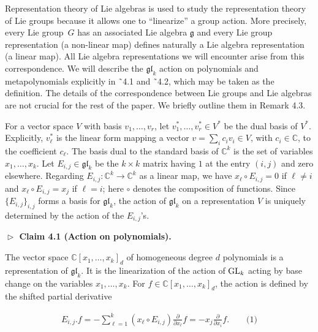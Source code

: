 \documentclass[10pt,a4paper]{article}
\begin{document}
Representation theory of Lie algebras is used to study the representation theory of Lie groups because it allows one to “linearize” a group action.
More precisely, every Lie group $G$ has an associated Lie algebra $\mathfrak{g}$ and every Lie group representation (a non-linear map) defines naturally a Lie algebra representation (a linear map).
All Lie algebra representations we will encounter arise from this correspondence. We will describe the $\mathfrak{gl}_{k}$ action on polynomials and metapolynomials explicitly in ˜4.1 and ˜4.2, which may be taken as the definition. The details of the correspondence between Lie groups and Lie algebras are not crucial for the rest of the paper. We briefly outline them in Remark 4.3.





For a vector space $V$ with basis $v_{1},\ldots,v_{r}$, let $v_{1}^{*},\ldots,v_{r}^{*}\in V^{*}$ be the dual basis of $V^{*}$.
Explicitly, $v_{\ell}^{*}$ is the linear form mapping a vector $v=\sum_{i}c_{i}v_{i}\in V$, with $c_{i}\in\mathbb{C}$, to the coefficient $c_{\ell}$.
The basis dual to the standard basis of $\mathbb{C}^{k}$ is the set of variables $x_{1},\ldots,x_{k}$.
Let $E_{i,j}\in\mathfrak{gl}_{k}$ be the $k\times k$ matrix having $1$ at the entry $(i,j)$ and zero elsewhere. Regarding $E_{i,j}:\mathbb{C}^{k}\to\mathbb{C}^{k}$ as a linear map, we have $x_{\ell}\circ E_{i,j}=0$ if $\ell\neq i$ and $x_{\ell}\circ E_{i,j}=x_{j}$ if $\ell=i$; here $\circ$ denotes the composition of functions. Since $\{E_{i,j}\}_{i,j}$ forms a basis for $\mathfrak{gl}_{k}$, the action of $\mathfrak{gl}_{k}$ on a representation $V$ is uniquely determined by the action of the $E_{i,j}$’s.





\par\medskip\noindent\textbf{$\vartriangleright$ Claim 4.1 (Action on polynomials).}\par



The vector space $\mathbb{C}[x_{1},\ldots,x_{k}]_{d}$ of homogeneous degree $d$ polynomials is a representation of $\mathfrak{gl}_{k}$. It is the linearization of the action of $\textnormal{GL}_{k}$ acting by base change on the variables $x_{1},\ldots,x_{k}$.
For $f\in\mathbb{C}[x_{1},\ldots,x_{k}]_{d}$, the action is defined by the shifted partial derivative



\[\begin{aligned}
\displaystyle E_{i,j}.f=-\sum_{\ell=1}^{k}(x_{\ell}\circ E_{i,j})\frac{\partial}{\partial x_{\ell}}f=-x_{j}\frac{\partial}{\partial x_{i}}f.\qquad\text{(1)}
\end{aligned}\]
\end{document}
